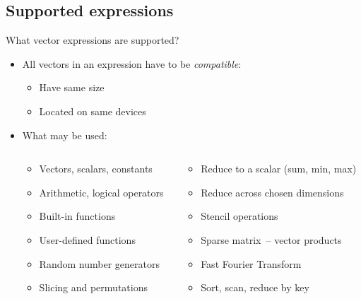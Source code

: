 \documentclass[@BEAMER_OPTIONS@]{beamer}
\begin{document}
\subsection{Supported expressions}
\begin{frame}[fragile]{What vector expressions are supported?}
    \begin{itemize}
        \item All vectors in an expression have to be \emph{compatible}:
            \begin{itemize}
                \item Have same size
                \item Located on same devices
            \end{itemize}
        \item What may be used:
            \begin{columns}
                \begin{column}{0.4\textwidth}
                    \begin{itemize}
                        \item Vectors, scalars, constants
                        \item Arithmetic, logical operators
                        \item Built-in functions
                        \item User-defined functions
                        \item Random number generators
                        \item Slicing and permutations
                    \end{itemize}
                \end{column}
                \begin{column}{0.42\textwidth}
                    \begin{itemize}
                        \item Reduce to a scalar (sum, min, max)
                        \item Reduce across chosen dimensions
                        \item Stencil operations
                        \item Sparse matrix~-- vector products
                        \item Fast Fourier Transform
                        \item Sort, scan, reduce by key
                    \end{itemize}
                \end{column}
            \end{columns}
    \end{itemize}
\end{frame}
\end{document}
